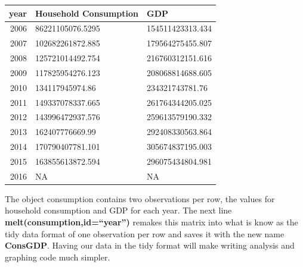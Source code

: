 \documentclass[12pt,a4paper,]{article}
\begin{document}
\begin{tabular}{r|l|l}
\hline
year & Household Consumption & GDP\\
\hline
2006 & 86221105076.5295 & 154511423313.434\\
\hline
2007 & 102682261872.885 & 179564275455.807\\
\hline
2008 & 125721014492.754 & 216760312151.616\\
\hline
2009 & 117825954276.123 & 208068814688.605\\
\hline
2010 & 134117945974.86 & 234321743781.76\\
\hline
2011 & 149337078337.665 & 261764344205.025\\
\hline
2012 & 143996472937.576 & 259613579190.332\\
\hline
2013 & 162407776669.99 & 292408330563.864\\
\hline
2014 & 170790407781.101 & 305674837195.003\\
\hline
2015 & 163855613872.594 & 296075434804.981\\
\hline
2016 & NA & NA\\
\hline
\end{tabular}

The object consumption contains two observations per row, the values for
household consumption and GDP for each year. The next line
\textbf{melt(consumption,id=``year'')} remakes this matrix into what is
know as the tidy data format of one observation per row and saves it
with the new name \textbf{ConsGDP}. Having our data in the tidy format
will make writing analysis and graphing code much simpler.
\end{document}
